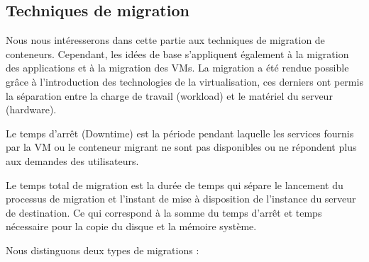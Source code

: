 \subsection{Techniques de migration}
Nous nous intéresserons dans cette partie aux techniques de migration de conteneurs. Cependant, les idées de base s'appliquent également à la migration des applications et à la migration des VMs. La migration a été rendue possible grâce à l'introduction des technologies de la virtualisation, ces derniers ont permis la séparation entre la charge de travail (workload) et le matériel du serveur (hardware).\par
Le temps d'arrêt (Downtime) est la période pendant laquelle les services fournis par la VM ou le conteneur migrant ne sont pas disponibles ou ne répondent plus aux demandes des utilisateurs.\par
Le temps total de migration est la durée de temps qui sépare le lancement du processus de migration et l'instant de mise à disposition de l'instance du serveur de destination. Ce qui correspond à la somme du temps d'arrêt et temps nécessaire pour la copie du disque et la mémoire système.\par
Nous distinguons deux types de migrations \cite{puliafito2019}:
